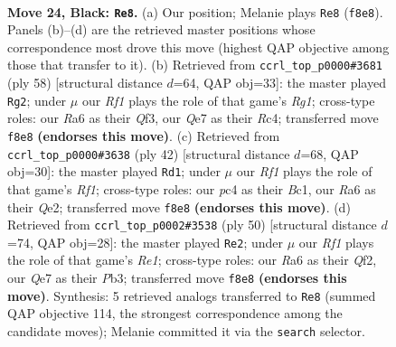 \documentclass[11pt]{article}
\begin{document}
\clearpage

\begin{figure}[p]\centering
\begin{subfigure}{0.46\textwidth}\centering
\resizebox{\linewidth}{!}{%
\newchessgame
\chessboard[
  setfen={5rk1/2p1qp2/r6p/2p1p1p1/2P1P1P1/3P3Q/5K2/1NB2R2 b - - 5 24},
  showmover=false,
  pgfstyle=straightmove, color=movearrow, markmove={f8-e8}
]}
\caption{}
\end{subfigure}\hfill
\begin{subfigure}{0.46\textwidth}\centering
\resizebox{\linewidth}{!}{%
\newchessgame
\chessboard[
  setfen={r6k/1q2p2p/3p1pr1/8/2R1PPP1/pP3Q2/P1P5/6RK w - - 3 30},
  showmover=false,
  pgfstyle=straightmove, color=movearrow, markmove={g1-g2}
]}
\caption{}
\end{subfigure}
\\[4pt]
\begin{subfigure}{0.46\textwidth}\centering
\resizebox{\linewidth}{!}{%
\newchessgame
\chessboard[
  setfen={1r4k1/1q1nbppp/4p3/4P3/8/2N5/1P2QPPP/2B2RK1 w - - 3 22},
  showmover=false,
  pgfstyle=straightmove, color=movearrow, markmove={f1-d1}
]}
\caption{}
\end{subfigure}\hfill
\begin{subfigure}{0.46\textwidth}\centering
\resizebox{\linewidth}{!}{%
\newchessgame
\chessboard[
  setfen={3r2k1/p1q2p2/6pb/1p5p/3P3P/1P2PBP1/P4Q2/4R1K1 w - - 3 26},
  showmover=false,
  pgfstyle=straightmove, color=movearrow, markmove={e1-e2}
]}
\caption{}
\end{subfigure}
\caption{\textbf{Move 24, Black: \texttt{Re8}.} (a) Our position; Melanie plays \texttt{Re8} (\texttt{f8e8}). Panels (b)--(d) are the retrieved master positions whose correspondence most drove this move (highest QAP objective among those that transfer to it). (b) Retrieved from \texttt{ccrl\_top\_p0000\#3681} (ply 58) [structural distance $d$=64, QAP obj=33]: the master played \texttt{Rg2}; under $\mu$ our \emph{Rf1} plays the role of that game's \emph{Rg1}; cross-type roles: our \emph{R}a6 as their \emph{Q}f3, our \emph{Q}e7 as their \emph{R}c4; transferred move \texttt{f8e8} \textbf{(endorses this move)}. (c) Retrieved from \texttt{ccrl\_top\_p0000\#3638} (ply 42) [structural distance $d$=68, QAP obj=30]: the master played \texttt{Rd1}; under $\mu$ our \emph{Rf1} plays the role of that game's \emph{Rf1}; cross-type roles: our \emph{p}c4 as their \emph{B}c1, our \emph{R}a6 as their \emph{Q}e2; transferred move \texttt{f8e8} \textbf{(endorses this move)}. (d) Retrieved from \texttt{ccrl\_top\_p0002\#3538} (ply 50) [structural distance $d$=74, QAP obj=28]: the master played \texttt{Re2}; under $\mu$ our \emph{Rf1} plays the role of that game's \emph{Re1}; cross-type roles: our \emph{R}a6 as their \emph{Q}f2, our \emph{Q}e7 as their \emph{P}b3; transferred move \texttt{f8e8} \textbf{(endorses this move)}. Synthesis: 5 retrieved analogs transferred to \texttt{Re8} (summed QAP objective 114, the strongest correspondence among the candidate moves); Melanie committed it via the \texttt{search} selector.}
\label{fig:thought-m47}
\end{figure}
\end{document}
